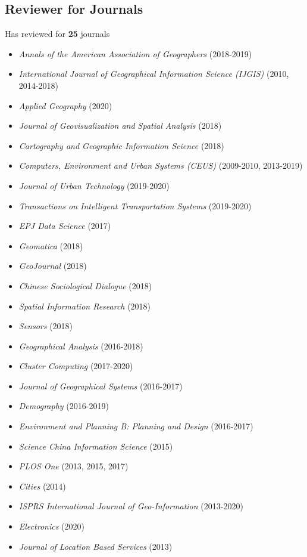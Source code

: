 \documentclass[11pt, a4paper]{article}
\begin{document}
\subsection*{Reviewer for Journals}
Has reviewed for \textbf{25} journals
\begin{itemize}
  \setlength\itemsep{0em}
  \item \emph{Annals of the American Association of Geographers} (2018-2019)  
  \item \emph{International Journal of Geographical Information Science (IJGIS)} (2010, 2014-2018)
  \item \emph{Applied Geography} (2020)  
  \item \emph{Journal of Geovisualization and Spatial Analysis} (2018)
  \item \emph{Cartography and Geographic Information Science} (2018)
  \item \emph{Computers, Environment and Urban Systems (CEUS)} (2009-2010, 2013-2019)
  \item \emph{Journal of Urban Technology} (2019-2020)
  \item \emph{Transactions on Intelligent Transportation Systems} (2019-2020)
  \item \emph{EPJ Data Science} (2017)
  \item \emph{Geomatica} (2018)
  \item \emph{GeoJournal} (2018)
  \item \emph{Chinese Sociological Dialogue} (2018)
  \item \emph{Spatial Information Research} (2018)
  \item \emph{Sensors} (2018)
  \item \emph{Geographical Analysis} (2016-2018)
  \item \emph{Cluster Computing} (2017-2020)
  \item \emph{Journal of Geographical Systems} (2016-2017)
  \item \emph{Demography} (2016-2019)
  \item \emph{Environment and Planning B: Planning and Design} (2016-2017)
  \item \emph{Science China Information Science} (2015)
  \item \emph{PLOS One} (2013, 2015, 2017)
  \item \emph{Cities} (2014)
  \item \emph{ISPRS International Journal of Geo-Information} (2013-2020)
  \item \emph{Electronics} (2020)
  \item \emph{Journal of Location Based Services} (2013)
\end{itemize} 
\end{document}
